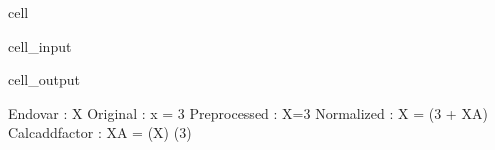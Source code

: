 \documentclass[letterpaper,10pt,english]{jupyterBook}
\begin{document}
\begin{sphinxuseclass}{cell}\begin{sphinxVerbatimInput}

\begin{sphinxuseclass}{cell_input}
\begin{sphinxVerbatim}[commandchars=\\\{\}]
\end{sphinxVerbatim}

\end{sphinxuseclass}\end{sphinxVerbatimInput}
\begin{sphinxVerbatimOutput}

\begin{sphinxuseclass}{cell_output}
\begin{sphinxVerbatim}[commandchars=\\\{\}]
Endo\PYGZus{}var        : X
Original        : x  = 3 
Preprocessed    : X=3
Normalized      : X = (3 + X\PYGZus{}A)                               
Calc\PYGZus{}add\PYGZus{}factor : X\PYGZus{}A = (X) \PYGZhy{} (3)
\end{sphinxVerbatim}

\begin{sphinxVerbatim}[commandchars=\\\{\}]

\end{sphinxVerbatim}

\end{sphinxuseclass}\end{sphinxVerbatimOutput}

\end{sphinxuseclass}
\end{document}
